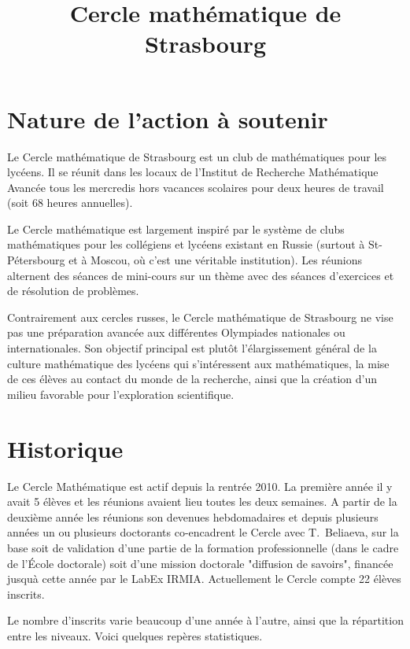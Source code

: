 \documentclass[11pt,notitlepage]{article}
\title{Cercle math\'ematique de Strasbourg}
\date{}
\begin{document}
\maketitle

\section{Nature de l'action \`a soutenir}
 
 Le Cercle math\'ematique de Strasbourg est un club de math\'ematiques pour les lyc\'eens. 
 Il se r\'eunit dans les locaux de l'Institut de Recherche Mathématique Avancée tous  les mercredis hors vacances scolaires pour deux heures de travail (soit 68 heures annuelles).
 
 Le Cercle math\'ematique est largement inspir\'e par le syst\`eme de
 clubs math\'ematiques pour les coll\'egiens et lyc\'eens existant en
 Russie (surtout \`a St-P\'etersbourg et \`a Moscou, o\`u c'est une  v\'eritable institution). Les r\'eunions alternent des s\'eances de mini-cours sur un th\`eme
 avec des s\'eances d'exercices et de r\'esolution de probl\`emes. 
 
 Contrairement aux cercles russes, le Cercle math\'ematique de
 Strasbourg ne vise pas une pr\'eparation avanc\'ee aux diff\'erentes
 Olympiades nationales ou internationales. Son objectif principal est
 plut\^ot l'\'elargissement g\'en\'eral de la culture math\'ematique des
 lyc\'eens qui s'int\'eressent aux math\'e\-matiques, la mise de ces
 \'el\`eves au contact du monde de la recherche, ainsi que la cr\'eation d'un milieu favorable pour l'exploration scientifique.
 

\section{Historique}
Le Cercle Math\'ematique est actif depuis la rentr\'ee 2010. La premi\`ere ann\'ee il y avait 5 \'el\`eves et les r\'eunions avaient lieu toutes les deux semaines. 
A partir de la deuxi\`eme ann\'ee les r\'eunions son devenues hebdomadaires et depuis plusieurs ann\'ees un ou plusieurs doctorants co-encadrent le Cercle avec T.~Beliaeva, 
sur la base soit de validation d'une partie de la formation professionnelle (dans le cadre de l'\'Ecole doctorale) soit d'une mission doctorale "diffusion de savoirs", 
financ\'ee jusqu\`a cette ann\'ee par le LabEx IRMIA. Actuellement le Cercle  compte 22 \'el\`eves inscrits.

Le nombre d'inscrits varie beaucoup d'une ann\'ee \`a l'autre, ainsi que la r\'epartition entre les niveaux. Voici quelques rep\`eres statistiques.
\end{document}
